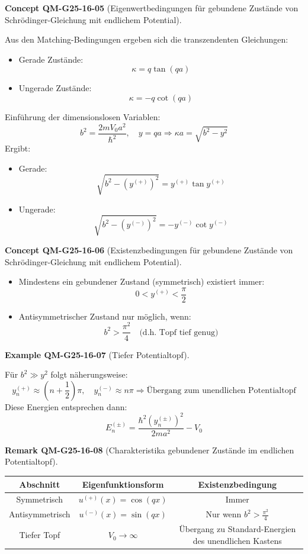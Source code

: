 \documentclass[10pt, letterpaper]{article}
\newcommand{\CustomHeading}[3]{%
  \par\medskip\noindent%
  \textbf{#1 #2} \textnormal{(#3)}.\enskip%
}
\newenvironment{REM}[2]{\CustomHeading{Remark}{#1}{#2}}{}
\newenvironment{EXA}[2]{\CustomHeading{Example}{#1}{#2}}{}
\newenvironment{CONC}[2]{\CustomHeading{Concept}{#1}{#2}}{}
\begin{document}
\begin{CONC}{QM-G25-16-05}{Eigenwertbedingungen für gebundene Zustände von Schrödinger-Gleichung mit endlichem Potential}
Aus den Matching-Bedingungen ergeben sich die transzendenten Gleichungen:
\begin{itemize}
\item Gerade Zustände:
  \[
  \kappa = q \tan(qa)
  \]
\item Ungerade Zustände:
  \[
  \kappa = -q \cot(qa)
  \]
\end{itemize}
Einführung der dimensionslosen Variablen:
\[
b^2 = \frac{2m V_0 a^2}{\hbar^2}, \quad y = qa
\Rightarrow \kappa a = \sqrt{b^2 - y^2}
\]
Ergibt:
\begin{itemize}
\item Gerade:
  \[
  \sqrt{b^2 - (y^{(+)})^2} = y^{(+)} \tan y^{(+)}
  \]
\item Ungerade:
  \[
  \sqrt{b^2 - (y^{(-)})^2} = - y^{(-)} \cot y^{(-)}
  \]
\end{itemize}
\end{CONC}

\begin{CONC}{QM-G25-16-06}{Existenzbedingungen für gebundene Zustände von Schrödinger-Gleichung mit endlichem Potential}
\begin{itemize}
\item Mindestens ein gebundener Zustand (symmetrisch) existiert immer:
  \[
  0 < y^{(+)} < \frac{\pi}{2}
  \]
\item Antisymmetrischer Zustand nur möglich, wenn:
  \[
  b^2 > \frac{\pi^2}{4}
  \quad \text{(d.h. Topf tief genug)}
  \]
\end{itemize}
\end{CONC}

\begin{EXA}{QM-G25-16-07}{Tiefer Potentialtopf}
Für \( b^2 \gg y^2 \) folgt näherungsweise:
\[
y_n^{(+)} \approx \left(n + \frac{1}{2}\right)\pi, \quad
y_n^{(-)} \approx n \pi
\Rightarrow \text{Übergang zum unendlichen Potentialtopf}
\]
Diese Energien entsprechen dann:
\[
E_n^{(\pm)} = \frac{\hbar^2 (y_n^{(\pm)})^2}{2ma^2} - V_0
\]
\end{EXA}

\begin{REM}{QM-G25-16-08}{Charakteristika gebundener Zustände im endlichen Potentialtopf}
\begin{tabular}{|c|c|c|}
\hline
\textbf{Abschnitt} & \textbf{Eigenfunktionsform} & \textbf{Existenzbedingung} \\
\hline
Symmetrisch & $u^{(+)}(x) = \cos(qx)$ & Immer \\
\hline
Antisymmetrisch & $u^{(-)}(x) = \sin(qx)$ & Nur wenn $b^2 > \frac{\pi^2}{4}$ \\
\hline
Tiefer Topf & $V_0 \to \infty$ & Übergang zu Standard-Energien des unendlichen Kastens \\
\hline
\end{tabular}
\end{REM}
\end{document}

